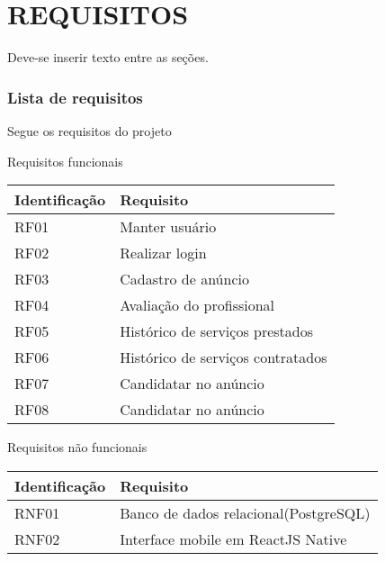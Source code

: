 \chapter{REQUISITOS}
Deve-se inserir texto entre as seções.
\subsection{Lista de requisitos}
Segue os requisitos do projeto
\begin{quadro}[htb]
	\centering
	\caption{\label{Formatação do texto.}Requisitos funcionais}	
	\begin{tabular}{|l|p{11cm}|}
		\hline
		\textbf{Identificação}    & \textbf{Requisito}\\ \hline
		RF01        			  & Manter usuário\\ \hline
		RF02        			  & Realizar login\\ \hline
		RF03         			  & Cadastro de anúncio\\ \hline
		RF04        			  & Avaliação do profissional\\ \hline
		RF05        			  & Histórico de serviços prestados\\ \hline
		RF06        			  & Histórico de serviços contratados \\ \hline
		RF07        			  & Candidatar no anúncio \\ \hline
		RF08        			  & Candidatar no anúncio 
		\\ \hline
	\end{tabular}
\end{quadro}

\begin{quadro}[htb]
	\centering
	\caption{\label{Formatação do texto.}Requisitos não funcionais}	
	\begin{tabular}{|l|p{11cm}|}
		\hline
		\textbf{Identificação}    & \textbf{Requisito}\\ \hline
		RNF01        			  & Banco de dados relacional(PostgreSQL)\\ \hline
		RNF02        			  & Interface mobile em ReactJS Native\\ \hline
	\end{tabular}
\end{quadro}


